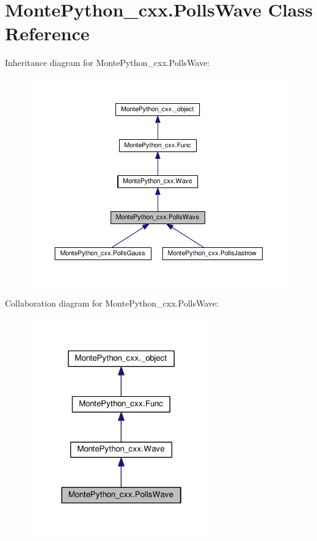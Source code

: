 \hypertarget{classMontePython__cxx_1_1PollsWave}{}\section{Monte\+Python\+\_\+cxx.\+Polls\+Wave Class Reference}
\label{classMontePython__cxx_1_1PollsWave}


Inheritance diagram for Monte\+Python\+\_\+cxx.\+Polls\+Wave\+:
\nopagebreak
\begin{figure}[H]
\begin{center}
\leavevmode
\includegraphics[width=350pt]{classMontePython__cxx_1_1PollsWave__inherit__graph}
\end{center}
\end{figure}


Collaboration diagram for Monte\+Python\+\_\+cxx.\+Polls\+Wave\+:
\nopagebreak
\begin{figure}[H]
\begin{center}
\leavevmode
\includegraphics[width=226pt]{classMontePython__cxx_1_1PollsWave__coll__graph}
\end{center}
\end{figure}
